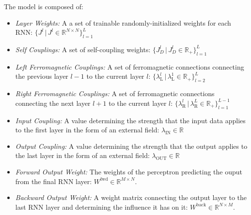 \documentclass[a4paper,12pt]{report}
\begin{document}
The model is composed of:
\begin{itemize}
    \itemsep-5pt
    \vspace*{-5pt}
    \item \emph{Layer Weights:} A a set of trainable randomly-initialized weights for 
    each RNN:  
    $\{ J^l \hspace{2pt} | \hspace{2pt} J^l \in \mathbb{R}^{N \times N}\}_{l=1}^{L}$
    \item \emph{Self Couplings:} A set of self-coupling weights:
    $\{ J_D^l \hspace{2pt} | \hspace{2pt} J_D^l \in \mathbb{R}_+\}_{l=1}^{L}$
    \item \emph{Left Ferromagnetic Couplings:} A set of ferromagnetic connections 
    connecting the previous layer $l-1$ to the current layer $l$: $ \{ \lambda_{\mathrm{L}}^l 
    \hspace{2pt} | \hspace{2pt} \lambda_{\mathrm{L}}^1 \in \mathbb{R}_+\}_{l=2}^L$
    \item \emph{Right Ferromagnetic Couplings:} A set of ferromagnetic connections
    connecting the next layer $l+1$ to the current layer $l$: $\{ \lambda_{\mathrm{R}}^l
    \hspace{2pt} | \hspace{2pt} \lambda_{\mathrm{R}}^L \in \mathbb{R}_+\}_{l=1}^{L-1}$
    \item \emph{Input Coupling:} A value determining the strength that the input data
    applies to the first layer in the form of an external field: $\lambda_{\mathrm{IN}} 
    \in \mathbb{R}$
    \item \emph{Output Coupling:} A value determining the strength that the output
    applies to the last layer in the form of an external field: $\lambda_{\mathrm{OUT}} 
    \in \mathbb{R}$
    \item \emph{Forward Output Weight:}  The weights of the perceptron predicting the 
    ouput from the final RNN layer: $W^{\mathrm{fwd}} \in \mathbb{R}^{M \times N}$.
    \item \emph{Backward Output Weight:} A weight matrix  connecting the output layer to the
    last RNN layer and determining the influence it has on it: $W^{\mathrm{back}} \in \mathbb{R}^{N \times M}$. 
\end{itemize}
\end{document}
